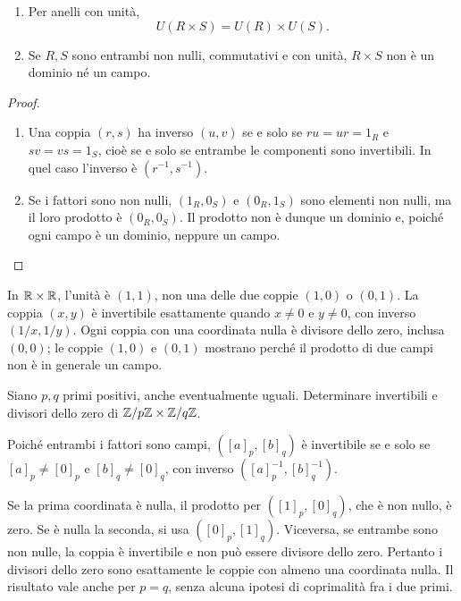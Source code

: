 \begin{proposizione}
\begin{enumerate}[label=\arabic*.]
\item Per anelli con unità,
\[
U(R\times S)=U(R)\times U(S).
\]
\item Se $R,S$ sono entrambi non nulli, commutativi e con unità, $R\times S$ non è un dominio né un campo.
\end{enumerate}
\end{proposizione}
\begin{proof}
\begin{enumerate}[label=\arabic*.]
\item Una coppia $(r,s)$ ha inverso $(u,v)$ se e solo se $ru=ur=1_R$ e $sv=vs=1_S$, cioè se e solo se entrambe le componenti sono invertibili. In quel caso l'inverso è $(r^{-1},s^{-1})$.
\item Se i fattori sono non nulli, $(1_R,0_S)$ e $(0_R,1_S)$ sono elementi non nulli, ma il loro prodotto è $(0_R,0_S)$. Il prodotto non è dunque un dominio e, poiché ogni campo è un dominio, neppure un campo.
\end{enumerate}
\end{proof}

\begin{esempio}
In $\mathbb{R}\times\mathbb{R}$, l'unità è $(1,1)$, non una delle due coppie $(1,0)$ o $(0,1)$. La coppia $(x,y)$ è invertibile esattamente quando $x\ne0$ e $y\ne0$, con inverso $(1/x,1/y)$. Ogni coppia con una coordinata nulla è divisore dello zero, inclusa $(0,0)$; le coppie $(1,0)$ e $(0,1)$ mostrano perché il prodotto di due campi non è in generale un campo.
\end{esempio}

\begin{esercizio}
Siano $p,q$ primi positivi, anche eventualmente uguali. Determinare invertibili e divisori dello zero di $\mathbb{Z}/p\mathbb{Z}\times\mathbb{Z}/q\mathbb{Z}$.
\end{esercizio}
\begin{svolgimento}
Poiché entrambi i fattori sono campi, $([a]_p,[b]_q)$ è invertibile se e solo se $[a]_p\ne[0]_p$ e $[b]_q\ne[0]_q$, con inverso $([a]_p^{-1},[b]_q^{-1})$.

Se la prima coordinata è nulla, il prodotto per $([1]_p,[0]_q)$, che è non nullo, è zero. Se è nulla la seconda, si usa $([0]_p,[1]_q)$. Viceversa, se entrambe sono non nulle, la coppia è invertibile e non può essere divisore dello zero. Pertanto i divisori dello zero sono esattamente le coppie con almeno una coordinata nulla. Il risultato vale anche per $p=q$, senza alcuna ipotesi di coprimalità fra i due primi.
\end{svolgimento}

